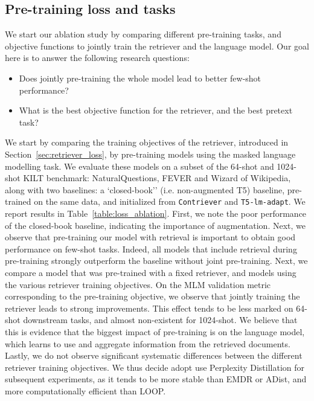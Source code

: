 \documentclass[10pt]{article} \usepackage[preprint]{tmlr}
\newcounter{rqcounter}
\newcommand{\RQ}{\stepcounter{rqcounter} \textbf{(RQ \arabic{rqcounter})}}
\begin{document}
\subsection{Pre-training loss and tasks}
\label{sec:loss_tasks}
We start our ablation study by comparing different pre-training tasks, and objective functions to jointly train the retriever and the language model.
Our goal here is to answer the following research questions:
\begin{itemize}[leftmargin=5em]
\item[\RQ] Does jointly pre-training the whole model lead to better few-shot performance?
\item[\RQ] What is the best objective function for the retriever, and the best pretext task?
\end{itemize}
We start by comparing the training objectives of the retriever, introduced in Section~\ref{sec:retriever_loss}, by pre-training models using the masked language modelling task.
We evaluate these models on a subset of the 64-shot and 1024-shot KILT benchmark:
NaturalQuestions, FEVER and Wizard of Wikipedia, along with two baselines:  a `closed-book'' (i.e. non-augmented T5) baseline, pre-trained on the same data, and initialized from \texttt{Contriever} and \texttt{T5-lm-adapt}.
We report results in Table~\ref{table:loss_ablation}.
First, we note the poor performance of the closed-book baseline, indicating the importance of augmentation.
Next, we observe that pre-training our model with retrieval is important to obtain good performance on few-shot tasks.
Indeed, all models that include retrieval during pre-training strongly outperform the baseline without joint pre-training.
Next, we compare a model that was pre-trained with a fixed retriever, and models using the various retriever training objectives.
On the MLM validation metric corresponding to the pre-training objective, we observe that jointly training the retriever leads to strong improvements.
This effect tends to be less marked on 64-shot downstream tasks, and almost non-existent for 1024-shot.
We believe that this is evidence that the biggest impact of pre-training is on the language model, which learns to use and aggregate information from the retrieved documents.
Lastly, we do not observe significant systematic differences between the different retriever training objectives.
We thus decide adopt use Perplexity Distillation for subsequent experiments, as it tends to be more stable than EMDR or ADist, and more computationally efficient than LOOP.
\end{document}
